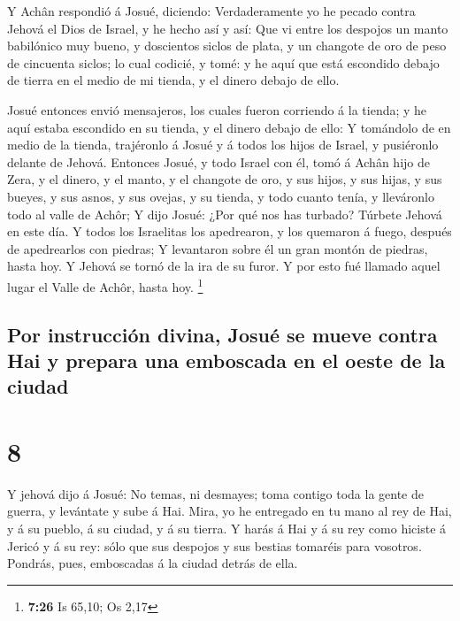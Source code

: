  Y Achân respondió á Josué, diciendo: Verdaderamente yo he
pecado contra Jehová el Dios de Israel, y he hecho así y así:
 Que vi entre los despojos un manto babilónico muy bueno, y
doscientos siclos de plata, y un changote de oro de peso de cincuenta
siclos; lo cual codicié, y tomé: y he aquí que está escondido debajo de
tierra en el medio de mi tienda, y el dinero debajo de ello.

 Josué entonces envió mensajeros, los cuales fueron
corriendo á la tienda; y he aquí estaba escondido en su tienda, y el
dinero debajo de ello:  Y tomándolo de en medio de la
tienda, trajéronlo á Josué y á todos los hijos de Israel, y pusiéronlo
delante de Jehová.  Entonces Josué, y todo Israel con él,
tomó á Achân hijo de Zera, y el dinero, y el manto, y el changote de
oro, y sus hijos, y sus hijas, y sus bueyes, y sus asnos, y sus ovejas,
y su tienda, y todo cuanto tenía, y lleváronlo todo al valle de Achôr;
 Y dijo Josué: ¿Por qué nos has turbado? Túrbete Jehová en
este día. Y todos los Israelitas los apedrearon, y los quemaron á fuego,
después de apedrearlos con piedras;  Y levantaron sobre él
un gran montón de piedras, hasta hoy. Y Jehová se tornó de la ira de su
furor. Y por esto fué llamado aquel lugar el Valle de Achôr, hasta hoy.
\footnote{\textbf{7:26} Is 65,10; Os 2,17}

\hypertarget{por-instrucciuxf3n-divina-josuuxe9-se-mueve-contra-hai-y-prepara-una-emboscada-en-el-oeste-de-la-ciudad}{%
\subsection{Por instrucción divina, Josué se mueve contra Hai y prepara
una emboscada en el oeste de la
ciudad}\label{por-instrucciuxf3n-divina-josuuxe9-se-mueve-contra-hai-y-prepara-una-emboscada-en-el-oeste-de-la-ciudad}}

\hypertarget{section-7}{%
\section{8}\label{section-7}}

 Y jehová dijo á Josué: No temas, ni desmayes; toma contigo
toda la gente de guerra, y levántate y sube á Hai. Mira, yo he entregado
en tu mano al rey de Hai, y á su pueblo, á su ciudad, y á su tierra.
 Y harás á Hai y á su rey como hiciste á Jericó y á su rey:
sólo que sus despojos y sus bestias tomaréis para vosotros. Pondrás,
pues, emboscadas á la ciudad detrás de ella.

